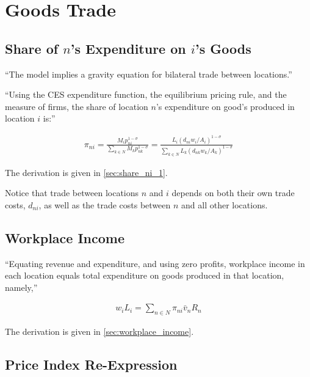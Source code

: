 \documentclass[10pt]{article}
\begin{document}
\section{Goods Trade}

\subsection{Share of $n$'s Expenditure on $i$'s Goods}

``The model implies a gravity equation 
for bilateral trade between locations.''

``Using the CES expenditure function, the 
equilibrium pricing rule, and the measure 
of firms, the 
share of location $n$'s expenditure on 
good's produced in location $i$ is:''

\begin{align}
    \pi_{n i}=\frac{M_i p_{n i}^{1-\sigma}}{\sum_{k \in N} M_k p_{n k}^{1-\sigma}}=\frac{L_i\left(d_{n i} w_i / A_i\right)^{1-\sigma}}{\sum_{k \in N} L_k\left(d_{n k} w_k / A_k\right)^{1-\sigma}} \label{eq:share_ni_1}
\end{align}

The derivation is given in \autoref{sec:share_ni_1}.

Notice that trade between locations $n$ and $i$
depends on both their own trade costs, $d_{n i}$,
as well as the trade costs between $n$ and all other locations.

\subsection{Workplace Income}

``Equating revenue and
expenditure, and using zero profits, workplace income in 
each location equals total expenditure 
on goods produced in that location, namely,''

\begin{align}
    w_i L_i=\sum_{n \in N} \pi_{n i} \bar{v}_n R_n \label{eq:workplace_income}
\end{align}

The derivation is given in \autoref{sec:workplace_income}.

\subsection{Price Index Re-Expression}
\end{document}

